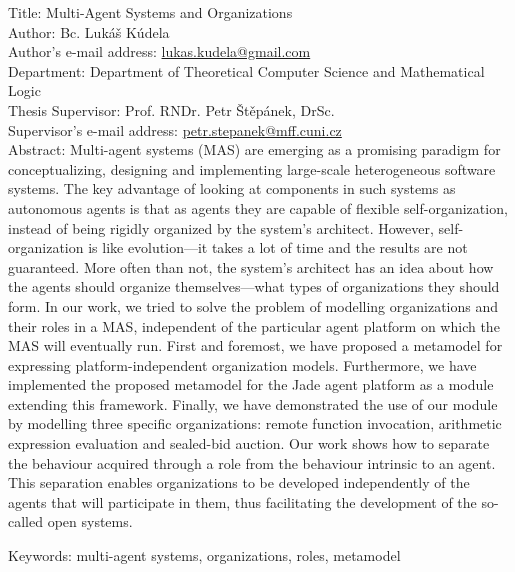 
Title: Multi-Agent Systems and Organizations\\
Author: Bc. Lukáš Kúdela\\
Author's e-mail address: \url{lukas.kudela@gmail.com}\\
Department: Department of Theoretical Computer Science and Mathematical Logic\\
Thesis Supervisor: Prof. RNDr. Petr Štěpánek, DrSc.\\
Supervisor's e-mail address: \url{petr.stepanek@mff.cuni.cz}\\

Abstract: Multi-agent systems (MAS) are emerging as a promising paradigm for conceptualizing, designing and implementing large-scale heterogeneous software systems.
The key advantage of looking at components in such systems as autonomous agents is that as agents they are capable of flexible self-organization, instead of being rigidly organized by the system's architect.
However, self-organization is like evolution---it takes a lot of time and the results are not guaranteed.
More often than not, the system's architect has an idea about how the agents should organize themselves---what types of organizations they should form.
In our work, we tried to solve the problem of modelling organizations and their roles in a MAS, independent of the particular agent platform on which the MAS will eventually run.
First and foremost, we have proposed a metamodel for expressing platform-independent organization models.
Furthermore, we have implemented the proposed metamodel for the Jade agent platform as a module extending this framework.
Finally, we have demonstrated the use of our module by modelling three specific organizations: remote function invocation, arithmetic expression evaluation and sealed-bid auction.
Our work shows how to separate the behaviour acquired through a role from the behaviour intrinsic to an agent. 
This separation enables organizations to be developed independently of the agents that will participate in them, thus facilitating the development of the so-called open systems.

Keywords: multi-agent systems, organizations, roles, metamodel
